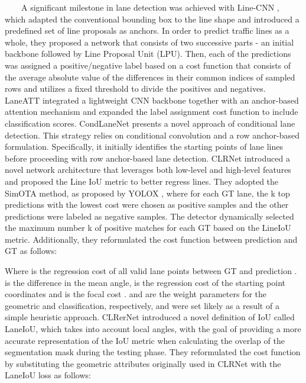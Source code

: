 \documentclass[10pt,twocolumn,letterpaper]{article}
\begin{document}
    A significant milestone in lane detection was achieved with Line-CNN \cite{li2019line}, which adapted the conventional bounding box to the line shape and introduced a predefined set of line proposals as anchors. In order to predict traffic lines as a whole, they proposed a network that consists of two successive parts - an initial backbone followed by Line Proposal Unit (LPU). Then, each of the predictions was assigned a positive/negative label based on a cost function that consists of the average absolute value of the differences in their common indices of sampled rows and utilizes a fixed threshold to divide the positives and negatives. LaneATT \cite{LaneATT} integrated a lightweight CNN backbone together with an anchor-based attention mechanism and expanded the label assignment cost function to include classification scores. CondLaneNet \cite{CondLaneNet} presents a novel approach of conditional lane detection. This strategy relies on conditional convolution and a row anchor-based formulation. Specifically, it initially identifies the starting points of lane lines before proceeding with row anchor-based lane detection. CLRNet \cite{CLRNet} introduced a novel network architecture that leverages both low-level and high-level features and proposed the Line IoU metric to better regress lines. They adopted the SimOTA method, as proposed by YOLOX \cite{YOLOX}, where for each GT lane, the k top predictions with the lowest cost were chosen as positive samples and the other predictions were labeled as negative samples. The detector dynamically selected the maximum number k of positive matches for each GT based on the LineIoU metric. Additionally, they reformulated the cost function between prediction  and GT  as follows:

Where  is the regression cost of all valid lane points between GT  and prediction .  is the difference in the mean angle,  is the regression cost of the starting point coordinates and  is the focal cost \cite{FocalLoss}.  and  are the weight parameters for the geometric and classification, respectively, and were set likely as a result of a simple heuristic approach. CLRerNet \cite{CLRerNet} introduced a novel definition of IoU called LaneIoU, which takes into account local angles, with the goal of providing a more accurate representation of the IoU metric when calculating the overlap of the segmentation mask during the testing phase. They reformulated the cost function by substituting the geometric attributes originally used in CLRNet with the LaneIoU loss as follows: 
\end{document}
